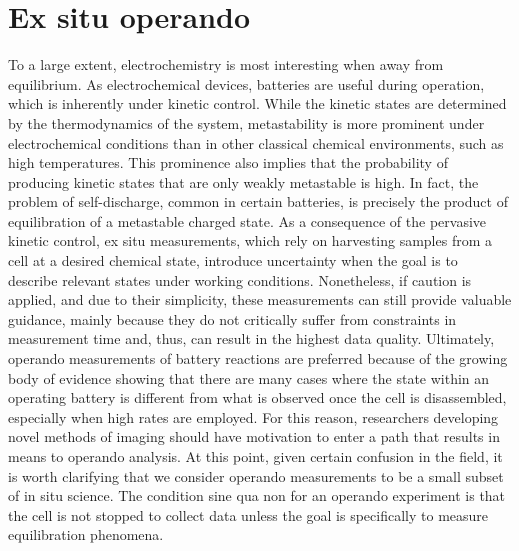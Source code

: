 \documentclass[journal=cmatex,manuscript=perspective]{achemso}
\begin{document}
\section{Ex situ  operando}

To a large extent, electrochemistry is most interesting when away from
equilibrium. As electrochemical devices, batteries are useful during
operation, which is inherently under kinetic control. While the
kinetic states are determined by the thermodynamics of the system,
metastability is more prominent under electrochemical conditions than
in other classical chemical environments, such as high
temperatures. This prominence also implies that the probability of
producing kinetic states that are only weakly metastable is high. In
fact, the problem of self-discharge, common in certain batteries, is
precisely the product of equilibration of a metastable charged
state. As a consequence of the pervasive kinetic control, ex situ
measurements, which rely on harvesting samples from a cell at a
desired chemical state, introduce uncertainty when the goal is to
describe relevant states under working conditions. Nonetheless, if
caution is applied, and due to their simplicity, these measurements
can still provide valuable guidance\cite{yu2015-2}, mainly because
they do not critically suffer from constraints in measurement time
and, thus, can result in the highest data quality. Ultimately,
operando measurements of battery reactions are preferred because of
the growing body of evidence showing that there are many cases where
the state within an operating battery is different from what is
observed once the cell is disassembled\cite{liu2014, lim2016},
especially when high rates are employed. For this reason, researchers
developing novel methods of imaging should have motivation to enter a
path that results in means to operando analysis. At this point, given
certain confusion in the field, it is worth clarifying that we
consider operando measurements to be a small subset of in situ
science. The condition sine qua non for an operando experiment is that
the cell is not stopped to collect data unless the goal is
specifically to measure equilibration phenomena.
\end{document}
